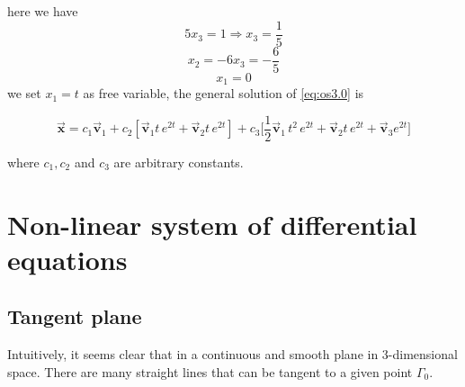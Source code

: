 \begin{solution}
    here we have
    \[
        5x_3 = 1 \Rightarrow x_3 = \frac{1}{5}
    \]
    \[
        x_2 = -6x_3 = -\frac{6}{5}
    \]
    \[
        x_1 = 0
    \]
    we set $x_1 = t$ as free variable, the general solution of \eqref{eq:os3.0} is 

    \[
        \overrightarrow{\mathbf{x}} = c_1 \overrightarrow{\mathbf{v}}_1 + c_2 [\overrightarrow{\mathbf{v}}_1 t\, e^{2t} + \overrightarrow{\mathbf{v}}_2 t\, e^{2t}]
        + c_3 \big[ \frac{1}{2} \overrightarrow{\mathbf{v}}_1 \, t^2 \, e^{2t} + \overrightarrow{\mathbf{v}}_2 t\, e^{2t} + \overrightarrow{\mathbf{v}}_3 e^{2t} \big]
    \]

    where $c_1, c_2$ and $c_3$ are arbitrary constants.
\end{solution}

\section{Non-linear system of differential equations}

\subsection{Tangent plane}

Intuitively, it seems clear that in a continuous and smooth plane in 3-dimensional space. There are many straight lines 
that can be tangent to a given point $\Gamma_0$.

